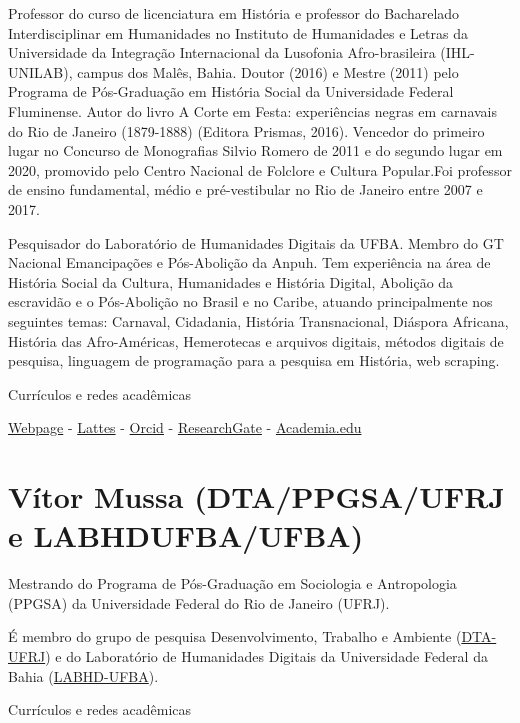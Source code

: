 \documentclass[
]{book}
\begin{document}
Professor do curso de licenciatura em História e professor do Bacharelado Interdisciplinar em Humanidades no Instituto de Humanidades e Letras da Universidade da Integração Internacional da Lusofonia Afro-brasileira (IHL-UNILAB), campus dos Malês, Bahia. Doutor (2016) e Mestre (2011) pelo Programa de Pós-Graduação em História Social da Universidade Federal Fluminense. Autor do livro A Corte em Festa: experiências negras em carnavais do Rio de Janeiro (1879-1888) (Editora Prismas, 2016). Vencedor do primeiro lugar no Concurso de Monografias Silvio Romero de 2011 e do segundo lugar em 2020, promovido pelo Centro Nacional de Folclore e Cultura Popular.Foi professor de ensino fundamental, médio e pré-vestibular no Rio de Janeiro entre 2007 e 2017.

Pesquisador do Laboratório de Humanidades Digitais da UFBA. Membro do GT Nacional Emancipações e Pós-Abolição da Anpuh. Tem experiência na área de História Social da Cultura, Humanidades e História Digital, Abolição da escravidão e o Pós-Abolição no Brasil e no Caribe, atuando principalmente nos seguintes temas: Carnaval, Cidadania, História Transnacional, Diáspora Africana, História das Afro-Américas, Hemerotecas e arquivos digitais, métodos digitais de pesquisa, linguagem de programação para a pesquisa em História, web scraping.

Currículos e redes acadêmicas

\href{https://ericbrasiln.github.io}{Webpage} - \href{http://lattes.cnpq.br/6853705640900524}{Lattes} - \href{\%22https://orcid.org/0000-0001-5067-8475}{Orcid} - \href{https://www.researchgate.net/profile/Eric_Brasil}{ResearchGate} - \href{https://unilab.academia.edu/EricBrasil}{Academia.edu}

\hypertarget{vuxedtor-mussa-dtappgsaufrj-e-labhdufbaufba}{%
\section{Vítor Mussa (DTA/PPGSA/UFRJ e LABHDUFBA/UFBA)}\label{vuxedtor-mussa-dtappgsaufrj-e-labhdufbaufba}}

Mestrando do Programa de Pós-Graduação em Sociologia e Antropologia (PPGSA) da Universidade Federal do Rio de Janeiro (UFRJ).

É membro do grupo de pesquisa Desenvolvimento, Trabalho e Ambiente (\href{https://www.nucleodta.org/inicio}{DTA-UFRJ}) e do Laboratório de Humanidades Digitais da Universidade Federal da Bahia (\href{http://www.labhd.ufba.br/}{LABHD-UFBA}).

Currículos e redes acadêmicas
\end{document}
